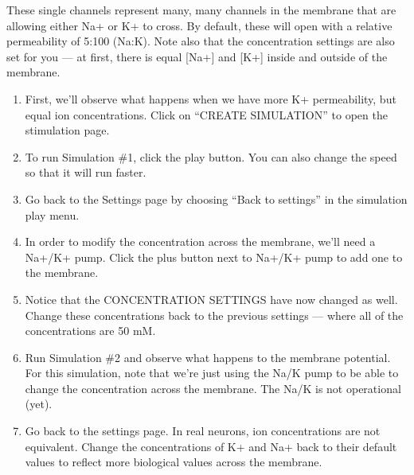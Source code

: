 \documentclass[letterpaper,10pt,english]{jupyterBook}
\begin{document}
\sphinxAtStartPar
These single channels represent many, many channels in the membrane that are allowing either Na+ or K+ to cross. By default, these will open with a relative permeability of 5:100 (Na:K). Note also that the concentration settings are also set for you — at first, there is equal {[}Na+{]} and {[}K+{]} inside and outside of the membrane.
\begin{enumerate}
%
\setcounter{enumi}{3}
\item {} 
\sphinxAtStartPar
First, we’ll observe what happens when we have more K+ permeability, but equal ion concentrations. Click on “CREATE SIMULATION” to open the stimulation page. 

\item {} 
\sphinxAtStartPar
To run Simulation \#1, click the play button. You can also change the speed so that it will run faster. 

\item {} 
\sphinxAtStartPar
Go back to the Settings page by choosing “Back to settings” in the simulation play menu.

\item {} 
\sphinxAtStartPar
In order to modify the concentration across the membrane, we’ll need a Na+/K+ pump.
Click the plus button next to Na+/K+ pump to add one to the membrane.

\item {} 
\sphinxAtStartPar
Notice that the CONCENTRATION SETTINGS have now changed as well.  Change these concentrations back to the previous settings — where all of the concentrations are 50 mM. 

\item {} 
\sphinxAtStartPar
Run Simulation \#2 and observe what happens to the membrane potential.  For this simulation, note that we’re just using the Na/K pump to be able to change the concentration across the membrane. The Na/K is not operational (yet).

\item {} 
\sphinxAtStartPar
Go back to the settings page. In real neurons, ion concentrations are not equivalent. Change the concentrations of K+ and Na+ back to their default values to reflect more biological values across the membrane. 


\end{enumerate}
\end{document}
